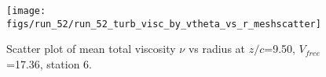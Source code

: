 \begin{figure}[H]
\centering
\texttt{[image: figs/run\_52/run\_52\_turb\_visc\_by\_vtheta\_vs\_r\_meshscatter]}
\caption{Scatter plot of mean total viscosity $\nu$ vs radius at $z/c$=9.50, $V_{free}$=17.36, station 6.}
\label{fig:run_52_turb_visc_by_vtheta_vs_r_meshscatter}
\end{figure}


